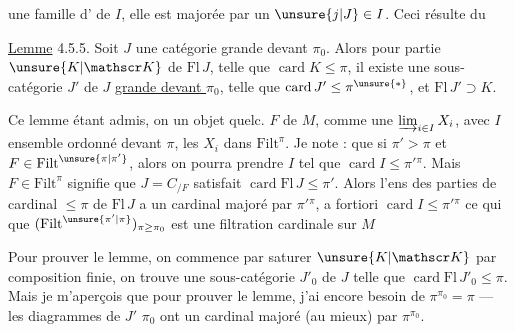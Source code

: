 une famille d' de $I$, elle est majorée par un $\unsure{j|J}\in I$. Ceci résulte du

\uline{Lemme} 4.5.5.  Soit $J$ une catégorie grande devant $\pi_0$. Alors pour  partie $\unsure{K|\mathscr K}$ de $\mathrm{Fl}\,J$, telle que $\operatorname{card}K\leq\pi$, il existe une sous-catégorie $J'$ de $J$ \uline{grande devant $\pi_0$}, telle que $\operatorname{card}J'\leq\pi^{\unsure{*}}$, et  $\mathrm{Fl}\,J'\supset K$.

 Ce lemme étant admis, on   un objet quelc. $F$ de $M$, comme une $\varinjlim_{i\in I}X_i$, avec $I$ ensemble ordonné  devant $\pi$, les $X_i$ dans $\mathrm{Filt}^{\pi}$. Je note :  que si $\pi'>\pi$ et $F\in\mathrm{Filt}^{\unsure{\pi|\pi'}}$, alors on pourra prendre $I$ tel que $\operatorname{card}I\leq\pi'{}^\pi$. Mais  $F\in\mathrm{Filt}^{\pi}$ signifie que $J=C_{/F}$ satisfait $\operatorname{card}\mathrm{Fl}\,J\leq\pi'$. Alors l'ens des parties de cardinal $\leq\pi$ de $\mathrm{Fl}\,J$  a un cardinal majoré par $\pi'{}^\pi$, a fortiori $\operatorname{card}I\leq\pi'{}^\pi$ ce qui  que $(\mathrm{Filt}^{\unsure{\pi'|\pi}})_{\pi\geq\pi_0}$ est une filtration cardinale sur $M$

Pour prouver le lemme, on commence par saturer $\unsure{K|\mathscr K}$ par composition finie, on trouve une sous-catégorie $J'_0$ de $J$ telle que $\operatorname{card}\mathrm{Fl}\,J'_0\leq\pi$. \unsure{\ldots} Mais je m'aperçois que pour prouver le lemme, j'ai encore besoin de $\pi^{\pi_0}=\pi$ ---   les diagrammes de $J'$    $\pi_0$ ont un cardinal majoré (au mieux) par $\pi^{\pi_0}$.

